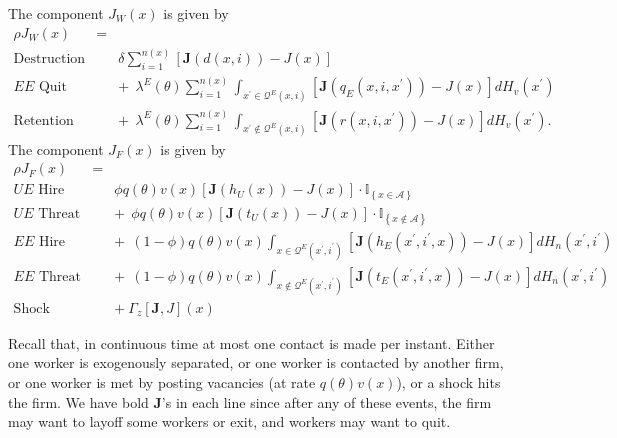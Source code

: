 The component $J_{W}\left( x\right) $ is given by
\begin{eqnarray*}
\rho J_{W}\left( x\right) &=& \\
\text{Destruction} &&\delta \sum\limits_{i=1}^{n\left( x\right) }\left[
\bm{J}\left( d(x,i)\right) -J\left( x\right) \right] \\
\text{$EE$ Quit} &&+\:\:\lambda^E(\theta)\sum\limits_{i=1}^{n\left( x\right)
}\int_{x^{\prime }\in \mathcal{Q}^{E}\left( x,i\right) }\left[ \bm{J}%
\left( q_{E}\left( x,i,x^{\prime }\right) \right) -J\left( x\right) \right]
dH_v\left( x^{\prime }\right) \\
\text{Retention} &&+\:\:\lambda^E(\theta)\sum\limits_{i=1}^{n\left( x\right)
}\int_{x^{\prime }\notin \mathcal{Q}^{E}\left( x,i\right) }\left[ \bm{J}%
\left( r\left( x,i,x^{\prime }\right) \right) -J\left( x\right) \right]
dH_v\left( x^{\prime }\right).
\end{eqnarray*}%
The component $J_{F}\left( x\right) $ is given by
\begin{eqnarray*}
\rho J_{F}\left( x\right) &=& \\
\text{$UE$ Hire} && \phi q(\theta)v\left( x\right) \left[ \bm{J}\left(
h_{U}\left( x\right) \right) -J\left( x\right) \right] \cdot \mathbb{I}%
_{\left\{ x\in \mathcal{A}\right\} } \\
\text{$UE$ Threat} &&+\:\:\phi q(\theta)v\left( x\right) \left[ \bm{J}%
\left( t_{U}\left( x\right) \right) -J\left( x\right) \right] \cdot \mathbb{I%
}_{\left\{ x\notin \mathcal{A}\right\} } \\
\text{$EE$ Hire} &&+\:\:\left( 1-\phi \right)q(\theta)v\left( x\right)
\int_{x\in \mathcal{Q}^{E}\left( x^{\prime },i^{\prime }\right) }\left[
\bm{J}\left( h_{E}\left( x^{\prime },i^{\prime },x\right) \right)
-J\left( x\right) \right] dH_n\left( x^{\prime },i^{\prime }\right) \\
\text{$EE$ Threat} &&+\:\:\left(1-\phi \right)q(\theta)v\left( x\right)
\int_{x\notin \mathcal{Q}^{E}\left( x^{\prime },i^{\prime }\right) }\left[
\bm{J}\left( t_{E}\left( x^{\prime },i^{\prime },x\right) \right)
-J\left( x\right) \right] dH_n\left( x^{\prime },i^{\prime }\right) \\
\text{Shock} &&+\:\Gamma _{z}\left[ \bm{J},J\right] \left( x\right)
\end{eqnarray*}

Recall that, in continuous time at most one contact is made
per instant. Either one worker is exogenously separated, or one
worker is contacted by another firm, or one worker is met by posting
vacancies (at rate $q(\theta)v(x)$), or a shock hits the firm. We have bold $\bm{J}$'s in each line since after any of these events, the firm may want to layoff some workers or exit, and workers may want to quit.

